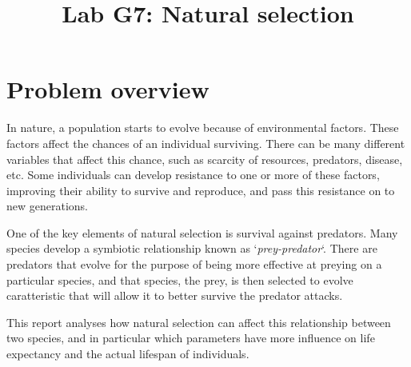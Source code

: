 \documentclass[conference]{IEEEtran}
\begin{document}
\title{
Lab G7: Natural selection
}

\author{
}

\maketitle
    
    

\section{Problem overview}

    In nature, a population starts to evolve because of environmental factors. 
    These factors affect the chances of an individual surviving. 
    There can be many different variables that affect this chance, such as scarcity of resources, predators, disease, etc. 
    Some individuals can develop resistance to one or more of these factors, improving their ability to survive and reproduce, and pass this resistance on to new generations. 

    One of the key elements of natural selection is survival against predators. Many species develop a symbiotic relationship known as `\textit{prey-predator}`. 
    There are predators that evolve for the purpose of being more effective at preying on a particular species, and that species, the prey, is then selected to evolve caratteristic that will allow it to better survive the predator attacks.

    This report analyses how natural selection can affect this relationship between two species, and in particular which parameters have more influence on life expectancy and the actual lifespan of individuals. 

\end{document}
